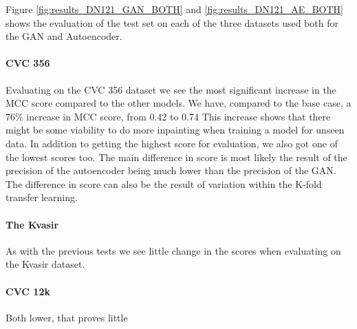 %
Figure \ref{fig:results_DN121_GAN_BOTH} and \ref{fig:results_DN121_AE_BOTH} shows the evaluation of the test set on each of the three datasets used both for the GAN and Autoencoder. 

\paragraph{CVC 356}
Evaluating on the CVC 356 dataset we see the most significant increase in the MCC score compared to the other models. 
We have, compared to the base case, a 76\% increase in MCC score, from 0.42 to 0.74
This increase shows that there might be some viability to do more inpainting when training a model for unseen data.
In addition to getting the highest score for evaluation, we also got one of the lowest scores too. 
The main difference in score is most likely the result of the precision of the autoencoder being much lower than the precision of the GAN.
The difference in score can also be the result of variation within the K-fold transfer learning.



\paragraph{The Kvasir}
As with the previous tests we see little change in the scores when evaluating on the Kvasir dataset.



\paragraph{CVC 12k}
Both lower, that proves little


































